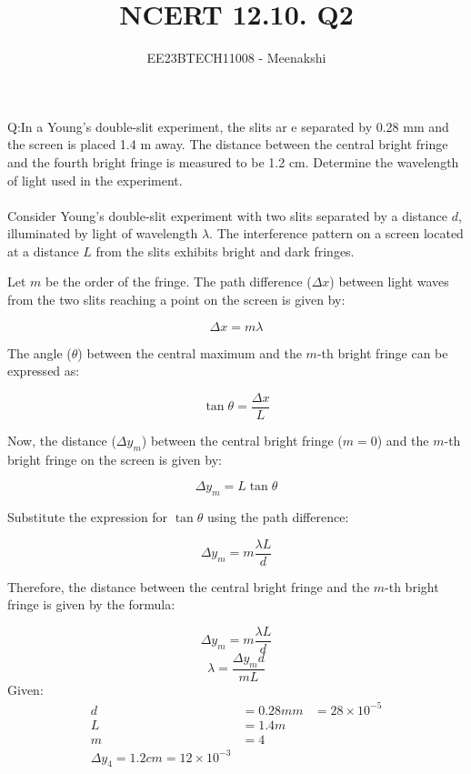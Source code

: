 \documentclass[journal,12pt,onecolumn]{IEEEtran}
\theoremstyle{remark}
\begin{document}
\let\vec\mathbf




\vspace{3cm}

\title{NCERT 12.10. Q2}
\author{EE23BTECH11008 - Meenakshi} 
\maketitle

\bigskip

\renewcommand{\thefigure}{\theenumi}
\renewcommand{\thetable}{\theenumi}
Q:In a Young’s double-slit experiment, the slits ar e separated by
0.28 mm and the screen is placed 1.4 m away. The distance between
the central bright fringe and the fourth bright fringe is measured
to be 1.2 cm. Determine the wavelength of light used in the
experiment.
\\\solution\\
Consider Young's double-slit experiment with two slits separated by a distance \(d\), illuminated by light of wavelength \(\lambda\). The interference pattern on a screen located at a distance \(L\) from the slits exhibits bright and dark fringes.

Let \(m\) be the order of the fringe. The path difference (\(\Delta x\)) between light waves from the two slits reaching a point on the screen is given by:

\[ \Delta x = m \lambda \]

The angle (\(\theta\)) between the central maximum and the \(m\)-th bright fringe can be expressed as:

\[ \tan \theta = \frac{\Delta x}{L} \]

Now, the distance (\(\Delta y_m\)) between the central bright fringe (\(m=0\)) and the \(m\)-th bright fringe on the screen is given by:

\[ \Delta y_m = L \tan \theta \]

Substitute the expression for \(\tan \theta\) using the path difference:

\[ \Delta y_m = m \frac{\lambda L}{d} \]

Therefore, the distance between the central bright fringe and the \(m\)-th bright fringe is given by the formula:

\[ \Delta y_m = m \frac{\lambda L}{d} \]
\[\lambda=\frac {\Delta y_m d}{mL}\]
Given:
\[
\begin{aligned}
   d&=0.28mm&=28 \times 10^{-5}\\
   L&= 1.4 m\\
   m&=4\\
   \Delta y_4=1.2cm= 12\times 10^{-3}
\end{aligned}
\]
\end{document}
